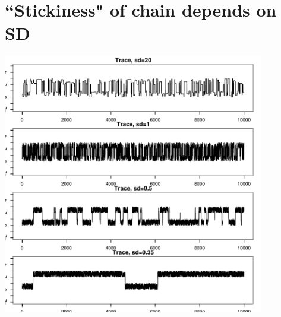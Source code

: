 \es\bs

\section*{``Stickiness" of chain depends on SD}
\centerline{\includegraphics[height=4.5in]{figures/compsd.pdf}}


\es\bs


